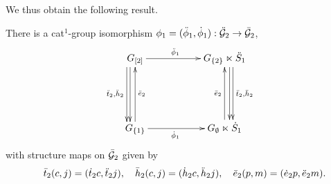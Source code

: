 \noindent
We thus obtain the following result.

\begin{lem}
There is a cat$^1$-group isomorphism 
$\phi_1 = (\ddot{\phi}_1,\dot{\phi}_1) : \ddot{\mathcal{G}}_2 \to \bar{\mathcal{G}}_2$,
$$
\xymatrix @C=2pc @R=2pc{
 \GGot \ar[dd] <-1.2ex>  \ar[dd] <-2.0ex>_{\ddttt,\ddhht}
   \ar[rr]^(0.45){\ddpho}
  &&  \GGbt \ltimes \ddSSo 
       \ar[dd] <+1.2ex>  \ar[dd] <+2.0ex>^{\barttt,\barhht}  \\
  &&   \\
 \GGbo \ar[uu]_{\ddeet}
   \ar[rr]_(0.45){\dpho}
  &&  \GGe \ltimes \dSSo  \ar[uu]^{\bareet}
 \\
}
$$
with structure maps on $\bar{\mathcal{G}}_2$  given by
$$
\quad \bar{t}_2(c,j) = (\dot{t}_2 c, \ddot{t}_2 j),
\quad \bar{h}_2(c,j) = (\dot{h}_2 c, \ddot{h}_2 j),
\quad \bar{e}_2(p,m) = (\dot{e}_2 p, \ddot{e}_2 m).
$$
\end{lem}
